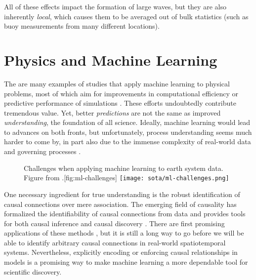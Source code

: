 All of these effects impact the formation of large waves, but they are also inherently \emph{local}, which causes them to be averaged out of bulk statistics (such as buoy measurements from many different locations).

\clearpage

\section{Physics and Machine Learning} \label{sec:sota-ml}

%
The are many examples of studies that apply machine learning to physical problems, most of which aim for improvements in computational efficiency or predictive performance of simulations \citep[\eg][]{pestourie_physics-enhanced_2021,bar-sinai_data-driven_2018,kochkov_machine_2021,li_kohn-sham_2020,cranmer_bayesian_2021,cranmer_lagrangian_2020}.
These efforts undoubtedly contribute tremendous value. Yet, better \emph{predictions} are not the same as improved \emph{understanding}, the foundation of all science. Ideally, machine learning would lead to advances on both fronts, but unfortunately, process understanding seems much harder to come by, in part also due to the immense complexity of real-world data and governing processes \citep[;][]{reichstein_deep_2019}.

\begin{figure}
    \begin{sidecaption}{Challenges when applying machine learning to earth system data. Figure from \citet{reichstein_deep_2019}.}[fig:ml-challenges]
        \antimpjustification
        \texttt{[image: sota/ml-challenges.png]}
    \end{sidecaption}
\end{figure}

One necessary ingredient for true understanding is the robust identification of causal connections over mere association. The emerging field of causality has formalized the identifiability of causal connections from data and provides tools for both causal inference and causal discovery \citep[see \eg][]{peters_elements_2017}. There are first promising applications of these methods \citep[for example in climate:][]{hannart_causal_2016,kretschmer_using_2016,runge_inferring_2019}, but it is still a long way to go before we will be able to identify arbitrary causal connections in real-world spatiotemporal systems. Nevertheless, explicitly encoding or enforcing causal relationships in models is a promising way to make machine learning a more dependable tool for scientific discovery.

